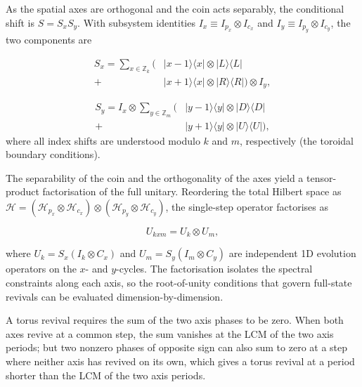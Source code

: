 \documentclass[aps,pra,reprint,amsmath,amssymb,superscriptaddress,floatfix]{revtex4-2}
\def\times{x}%
\begin{document}
As the spatial axes are orthogonal and the coin acts separably,
the conditional shift is $S = S_x S_y$. With subsystem identities
$I_x \equiv I_{p_x} \otimes I_{c_x}$ and
$I_y \equiv I_{p_y} \otimes I_{c_y}$, the two components are
\par
\begin{equation}
\begin{aligned}
S_x = \sum_{x \in \mathbb{Z}_k} \Big( &|x-1\rangle\langle x| \otimes |L\rangle\langle L| \\
+ &|x+1\rangle\langle x| \otimes |R\rangle\langle R| \Big) \otimes I_y,
\end{aligned}
\label{eq:shift_x}
\end{equation}
\par
\begin{equation}
\begin{aligned}
S_y = I_x \otimes \sum_{y \in \mathbb{Z}_m} \Big( &|y-1\rangle\langle y| \otimes |D\rangle\langle D| \\
+ &|y+1\rangle\langle y| \otimes |U\rangle\langle U| \Big),
\end{aligned}
\label{eq:shift_y}
\end{equation}
where all index shifts are understood modulo \(k\) and \(m\),
respectively (the toroidal boundary conditions).
\par
The separability of the coin and the orthogonality of the axes yield
a tensor-product factorisation of the full unitary. Reordering the
total Hilbert space as $\mathcal{H} = (\mathcal{H}_{p_x} \otimes
\mathcal{H}_{c_x}) \otimes (\mathcal{H}_{p_y} \otimes
\mathcal{H}_{c_y})$, the single-step operator factorises as
\par
\begin{equation}
U_{k \times m} = U_k \otimes U_m,
\label{eq:factorised_unitary}
\end{equation}
\par
where $U_k = S_x (I_k \otimes C_x)$ and $U_m = S_y (I_m \otimes C_y)$
are independent 1D evolution operators on the $x$- and $y$-cycles.
The factorisation isolates the spectral constraints along each axis,
so the root-of-unity conditions that govern full-state revivals can
be evaluated dimension-by-dimension.

A torus revival requires the sum of the two axis phases to be zero. When both axes revive 
at a common step, the sum vanishes at the LCM of the two axis periods; but two nonzero 
phases of opposite sign can also sum to zero at a step where neither axis has revived on its 
own, which gives a torus revival at a period shorter than the LCM of the two axis periods.
\end{document}
